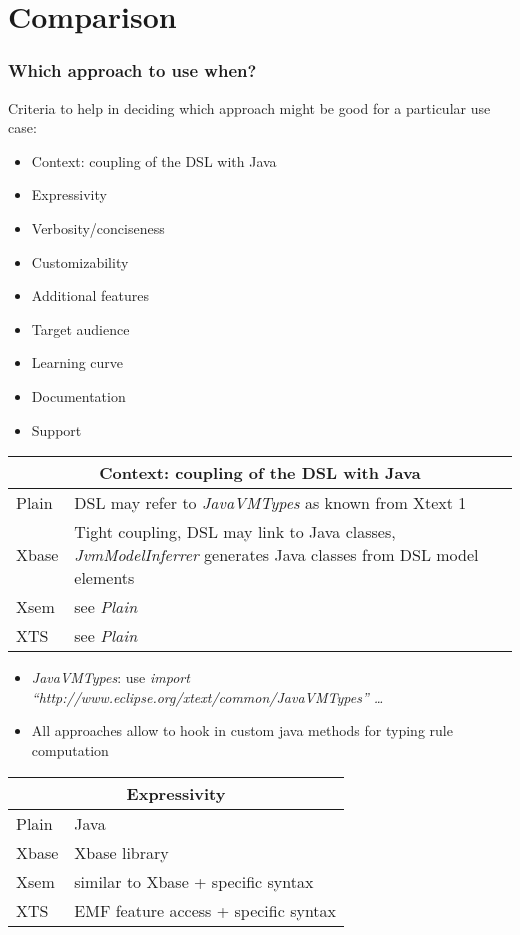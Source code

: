 \section{Comparison}

\begin{frame}
  \frametitle{Which approach to use when?}
  
  Criteria to help in deciding which approach might be good for a particular use
  case:
  \begin{itemize}
    \item Context: coupling of the DSL with Java
    \item Expressivity
    \item Verbosity/conciseness
    \item Customizability
    \item Additional features
    \item Target audience
    \item Learning curve
    \item Documentation
    \item Support
  \end{itemize}

\framebreak  
\begin{tabularx}{\linewidth}{ l   X }
\multicolumn{2}{c}{Context: coupling of the DSL with Java} \\ \hline
Plain & DSL may refer to \emph{JavaVMTypes} as known from Xtext 1\\
Xbase & Tight coupling, DSL may link to Java classes, \emph{JvmModelInferrer}
generates Java classes from DSL model elements\\
Xsem & see \emph{Plain} \\
XTS & see \emph{Plain} \\
\end{tabularx}
\begin{itemize}
  \item \emph{JavaVMTypes}: use \emph{import
  ``http://\-www.eclipse.org/\-xtext/\-common/\-JavaVMTypes'' \ldots}
  \item All approaches allow to hook in custom java methods for typing rule
  computation
\end{itemize}

\framebreak
\begin{tabularx}{\linewidth}{ l   X }
\multicolumn{2}{c}{Expressivity} \\ \hline
Plain & Java \\
Xbase & Xbase library \\
Xsem & similar to Xbase + specific syntax\\
XTS & EMF feature access + specific syntax\\
\end{tabularx}


\end{frame}
